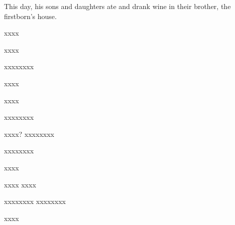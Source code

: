 \begin{inparaenum}
   This day, his sons and daughters ate and drank wine in their brother, the firstborn's house.%
   \smallskip%
  
  \pb xxxx%
  
  \pb xxxx%
  
  {\noindent{} \smallskip}%
  
  \pb xxxx\pa xxxx%
  
  \pb xxxx%
  
  \pb xxxx\smallskip%
  
  \noindent{} \smallskip%
  
  \pb xxxx\pa xxxx%
  
  \pa xxxx?  xxxx\pa xxxx%
  
  \pb xxxx\pa xxxx%
  
  \pb xxxx\smallskip%
  
  \noindent{} xxxx\smallskip%
   xxxx%
  
  \pe xxxx\pa xxxx%
  \pe xxxx\pa xxxx\smallskip%
  
  \noindent{} xxxx%
\end{inparaenum}
